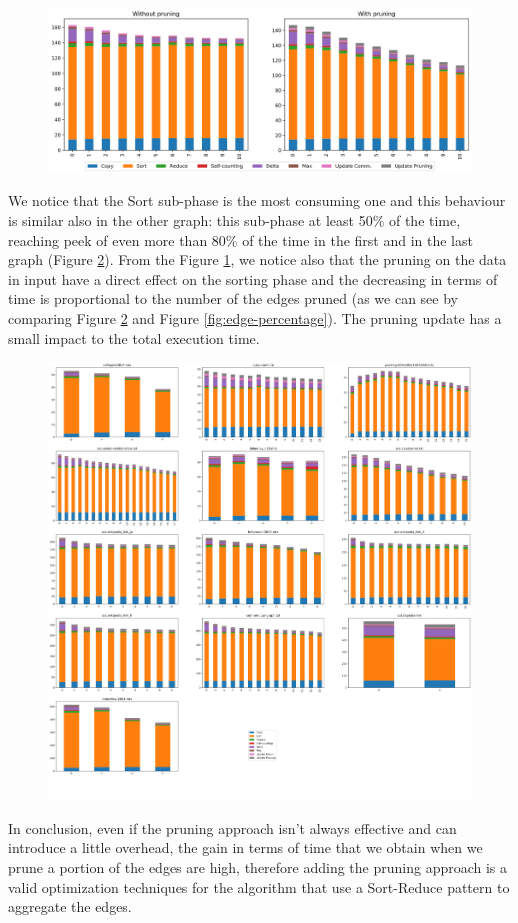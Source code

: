 \begin{figure}
	\centering
	\includegraphics[width=1\linewidth]{0-resources/livejournal-comparison-sort.png}
	\caption{}
	\label{fig:livejournal-comparison}
\end{figure}
We notice that the Sort sub-phase is the most consuming one and this behaviour is similar also in the other graph: this sub-phase at least 50\% of the time, reaching peek of even more than 80\% of the time in the first and in the last graph (Figure \ref{fig:suphases-sort}). From the Figure \ref{fig:livejournal-comparison}, we notice also that the pruning on the data in input have a direct effect on the sorting phase and the decreasing in terms of time is proportional to the number of the edges pruned (as we can see by comparing Figure \ref{fig:suphases-sort} and Figure \ref{fig:edge-percentage}). The pruning update has a small impact to the total execution time. 
\begin{figure}[h]
	\centering
	\includegraphics[width=1\linewidth]{0-resources/suphases-sort}
	\caption{}
	\label{fig:suphases-sort}
\end{figure}
In conclusion, even if the pruning approach isn't always effective and can introduce a little overhead, the gain in terms of time that we obtain when we prune a portion of the edges are high, therefore adding the pruning approach is a valid optimization techniques for the algorithm that use a Sort-Reduce pattern to aggregate the edges. 
